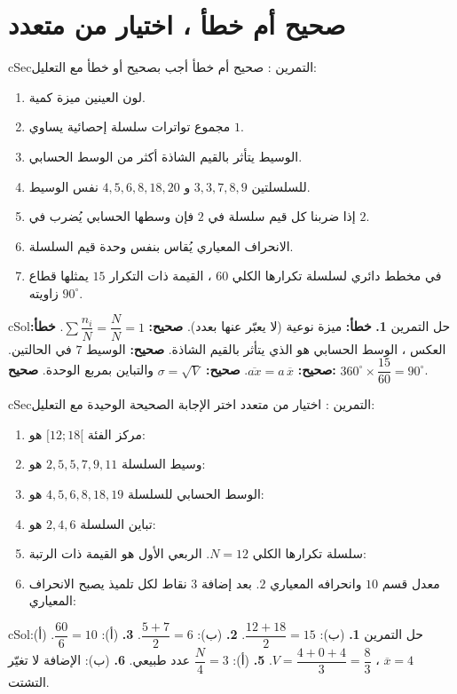 \documentclass[12pt,a4paper]{article}
\newenvironment{BOX}[2]{\begin{otherlanguage}{english}\begin{arbox}{#1}{#2}}{\end{arbox}\end{otherlanguage}}
\newcounter{exo}
\newenvironment{tamrin}[1]{\stepcounter{exo}\begin{BOX}{cSec}{التمرين \theexo: #1}}{\end{BOX}}
\newenvironment{hal}{\Needspace{12\baselineskip}\begin{otherlanguage}{english}\begin{arbox}[breakable]{cSol}{حل التمرين \theexo}}{\end{arbox}\end{otherlanguage}}
\begin{document}
\section{صحيح أم خطأ ، اختيار من متعدد}
\begin{tamrin}{صحيح أم خطأ}
أجب بصحيح أو خطأ مع التعليل:
\begin{enumerate}
\item لون العينين ميزة كمية.
\item مجموع تواترات سلسلة إحصائية يساوي $1$.
\item الوسيط يتأثر بالقيم الشاذة أكثر من الوسط الحسابي.
\item للسلسلتين $3,3,7,8,9$ و $4,5,6,8,18,20$ نفس الوسيط.
\item إذا ضربنا كل قيم سلسلة في $2$ فإن وسطها الحسابي يُضرب في $2$.
\item الانحراف المعياري يُقاس بنفس وحدة قيم السلسلة.
\item في مخطط دائري لسلسلة تكرارها الكلي $60$ ، القيمة ذات التكرار $15$ يمثلها قطاع زاويته $90^\circ$.
\end{enumerate}
\end{tamrin}
\begin{hal}
\textbf{1.} \textbf{خطأ:} ميزة نوعية (لا يعبّر عنها بعدد).
 \textbf{صحيح:} $\sum\dfrac{n_i}N=\dfrac NN=1$.
 \textbf{خطأ:} العكس ، الوسط الحسابي هو الذي يتأثر بالقيم الشاذة.
 \textbf{صحيح:} الوسيط $7$ في الحالتين.
 \textbf{صحيح:} $\overline{ax}=a\,\overline x$.
 \textbf{صحيح:} $\sigma=\sqrt V$ والتباين بمربع الوحدة.
 \textbf{صحيح:} $360^\circ\times\dfrac{15}{60}=90^\circ$.
\end{hal}

\begin{tamrin}{اختيار من متعدد}
اختر الإجابة الصحيحة الوحيدة مع التعليل:
\begin{enumerate}
\item مركز الفئة $[12;18[$ هو:
\item وسيط السلسلة $2,5,5,7,9,11$ هو:
\item الوسط الحسابي للسلسلة $4,5,6,8,18,19$ هو:
\item تباين السلسلة $2,4,6$ هو:
\item سلسلة تكرارها الكلي $N=12$. الربعي الأول هو القيمة ذات الرتبة:
\item معدل قسم $10$ وانحرافه المعياري $2$. بعد إضافة $3$ نقاط لكل تلميذ يصبح الانحراف المعياري:
\end{enumerate}
\end{tamrin}
\begin{hal}
\textbf{1.} (ب): $\dfrac{12+18}2=15$. \quad \textbf{2.} (ب): $\dfrac{5+7}2=6$. \quad \textbf{3.} (أ): $\dfrac{60}6=10$.
 (أ): $\overline x=4$ ، $V=\dfrac{4+0+4}3=\dfrac83$. \quad \textbf{5.} (أ): $\dfrac N4=3$ عدد طبيعي. \quad \textbf{6.} (ب): الإضافة لا تغيّر التشتت.
\end{hal}
\end{document}
